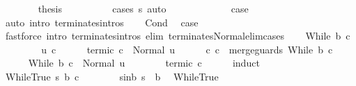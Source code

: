 \begin{isabellebody}
\ \ \ \ \ \ \isamarkupfalse%
\ {\isacharquery}thesis\isanewline
\ \ \ \ \ \ \ \ \isamarkupfalse%
\ {\isacharparenleft}cases\ s{\isacharprime}{\isacharparenright}\ {\isacharparenleft}auto{\isacharparenright}\isanewline
\ \ \ \ \isamarkupfalse%
\isanewline
\ \ \isacommand{{\isacharbraceright}}\isamarkupfalse%
\isanewline
\ \ \isamarkupfalse%
\ \isamarkupfalse%
\ {\isacharquery}case\ \isamarkupfalse%
\ {\isacharparenleft}auto\ intro{\isacharcolon}\ terminates{\isachardot}intros{\isacharparenright}\isanewline
{}\isamarkupfalse%
\isanewline
\ \ \isamarkupfalse%
\ Cond\ \isamarkupfalse%
\ {\isacharquery}case\ \isanewline
\ \ \ \ \isamarkupfalse%
\ {\isacharparenleft}fastforce\ intro{\isacharcolon}\ terminates{\isachardot}intros\ elim{\isacharcolon}\ terminates{\isacharunderscore}Normal{\isacharunderscore}elim{\isacharunderscore}cases{\isacharparenright}\isanewline
{}\isamarkupfalse%
\isanewline
\ \ \isamarkupfalse%
\ {\isacharparenleft}While\ b\ c{\isacharparenright}\isanewline
\ \ \isacommand{{\isacharbraceleft}}\isamarkupfalse%
\isanewline
\ \ \ \ \isamarkupfalse%
\ u\ c{\isacharprime}\isanewline
\ \ \ \ \isamarkupfalse%
\ termi{\isacharunderscore}c{\isacharprime}{\isacharcolon}\ {\isachardoublequoteopen}{\isasymGamma}{\isasymturnstile}c{\isacharprime}\ {\isasymdown}\ Normal\ u{\isachardoublequoteclose}\isanewline
\ \ \ \ \isamarkupfalse%
\ c{\isacharprime}{\isacharcolon}\ {\isachardoublequoteopen}c{\isacharprime}\ {\isacharequal}\ merge{\isacharunderscore}guards\ {\isacharparenleft}While\ b\ c{\isacharparenright}{\isachardoublequoteclose}\isanewline
\ \ \ \ \isamarkupfalse%
\ {\isachardoublequoteopen}{\isasymGamma}{\isasymturnstile}While\ b\ c\ {\isasymdown}\ Normal\ u{\isachardoublequoteclose}\isanewline
\ \ \ \ \ \ \isamarkupfalse%
\ termi{\isacharunderscore}c{\isacharprime}\ c{\isacharprime}\isanewline
\ \ \ \ \isamarkupfalse%
\ {\isacharparenleft}induct{\isacharparenright}\isanewline
\ \ \ \ \ \ \isamarkupfalse%
\ {\isacharparenleft}WhileTrue\ s\ b{\isacharprime}\ c{\isacharprime}{\isacharparenright}\isanewline
\ \ \ \ \ \ \isamarkupfalse%
\ s{\isacharunderscore}in{\isacharunderscore}b{\isacharcolon}\ {\isachardoublequoteopen}s\ {\isasymin}\ b{\isachardoublequoteclose}\ \isamarkupfalse%
\ WhileTrue\ \isamarkupfalse%

\end{isabellebody}

